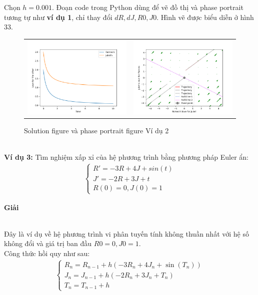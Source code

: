 Chọn $h=0.001$. Đoạn code trong Python dùng để vẽ đồ thị và phase portrait tương tự như \textbf{ví dụ 1}, chỉ thay đổi $dR, dJ, R0, J0$. Hình vẽ được biểu diễn ở hình 33.
\begin{figure}[h!]
    \begin{center}
        \begin{tabular}{cc}
             \includegraphics[width=7cm]{images/euler_2.png} &
             \includegraphics[width=7cm]{images/euler_2_portrait.png}\\
        \end{tabular}
        \caption{Solution figure và phase portrait figure Ví dụ 2}
    \end{center}
\end{figure}\\
\textbf{Ví dụ 3:}  Tìm nghiệm xấp xỉ của hệ phương trình bằng phương pháp Euler ẩn:
\begin{align*}
    \begin{cases}
        R'=-3R+4J+sin(t)\\
        J'=-2R+3J+t\\
        R(0)=0, J(0)=1
    \end{cases}
\end{align*}
\centerline{\textbf{Giải}}\\
Đây là ví dụ về hệ phương trình vi phân tuyến tính không thuần nhất với hệ số không đổi và giá trị ban đầu $R0 = 0, J0 = 1$.\\
Công thức hồi quy như sau:
\begin{align*}
    \begin{cases}
        R_n=R_{n-1}+h(-3R_n+4J_n+\sin(T_n))\\
        J_n=J_{n-1}+h(-2R_n+3J_n+T_n)\\
        T_n=T_{n-1}+h
    \end{cases}
\end{align*}
